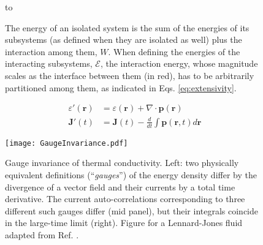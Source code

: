 \begin{figure}[t]
\hbox to 
\caption{The energy of an isolated system is the sum of the energies of its subsystems (as defined when they are isolated as well) plus the interaction among them, $W$. When defining the energies of the interacting subsystems, $\mathcal{E}$, the interaction energy, whose magnitude scales as the interface between them (in red), has to be arbitrarily partitioned among them, as indicated in Eqs. \eqref{eq:extensivity}.} 
\label{fig:energy-partition}
\end{figure}

\begin{figure}[b]
\begin{minipage}{0.3\textwidth}
\begin{small}
\begin{align*}
\varepsilon'(\mathbf{r}) &= \varepsilon(\mathbf{r}) + \nabla\cdot\mathbf{p}(\mathbf{r}) \\
\mathbf{J}'(t) &= \mathbf{J}(t) - \frac{d}{dt}\int \mathbf{p}(\mathbf{r},t)d\mathbf{r}
\end{align*}
\end{small}
\end{minipage}
\begin{minipage}{0.7\textwidth}
\centering \texttt{[image: GaugeInvariance.pdf]}
\end{minipage}
\vspace*{-2mm}
\caption{Gauge invariance of thermal conductivity. Left: two physically equivalent definitions (``\emph{gauges}'') of the energy density differ by the divergence of a vector field and their currents by a total time derivative. The current auto-correlations corresponding to three different such gauges differ (mid panel), but their integrals coincide in the large-time limit (right). Figure for a Lennard-Jones fluid adapted from Ref. .} 
\label{fig:gauge-invariance}
\end{figure}

